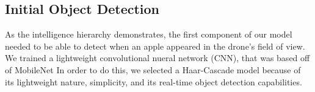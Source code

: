 \subsection{Initial Object Detection}
As the intelligence hierarchy demonstrates, the first component of our model needed to be able to detect when an apple appeared in the drone's field of view. 
We trained a lightweight convolutional nueral network (CNN), that was based off of MobileNet
In order to do this, we selected a Haar-Cascade model because of its lightweight nature, simplicity, and its real-time object detection capabilities. 